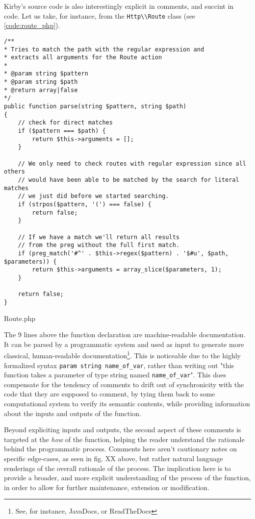 Kirby's source code is also interestingly explicit in comments, and succint in code. Let us take, for instance, from the \lstinline{Http\\Route} class (see \ref{code:route_php}).

\begin{listing}
  \begin{verbatim}
/**
* Tries to match the path with the regular expression and
* extracts all arguments for the Route action
*
* @param string $pattern
* @param string $path
* @return array|false
*/
public function parse(string $pattern, string $path)
{
    // check for direct matches
    if ($pattern === $path) {
        return $this->arguments = [];
    }

    // We only need to check routes with regular expression since all others
    // would have been able to be matched by the search for literal matches
    // we just did before we started searching.
    if (strpos($pattern, '(') === false) {
        return false;
    }

    // If we have a match we'll return all results
    // from the preg without the full first match.
    if (preg_match('#^' . $this->regex($pattern) . '$#u', $path, $parameters)) {
        return $this->arguments = array_slice($parameters, 1);
    }

    return false;
}
\end{verbatim}
  \caption{Route.php}
  \label{code:route_php}
\end{listing}

The 9 lines above the function declaration are machine-readable documentation. It can be parsed by a programmatic system and used as input to generate more classical, human-readable documentation\footnote{See, for instance, JavaDocs, or ReadTheDocs}. This is noticeable due to the highly formalized syntax \lstinline{param string name_of_var}, rather than writing out "this function takes a parameter of type string named \lstinline{name_of_var}". This does compensate for the tendency of comments to drift out of synchronicity with the code that they are supposed to comment, by tying them back to some computational system to verify its semantic contents, while providing information about the inputs and outputs of the function.

Beyond expliciting inputs and outputs, the second aspect of these comments is targeted at the \emph{how} of the function, helping the reader understand the rationale behind the programmatic process. Comments here aren't cautionary notes on specific edge-cases, as seen in fig. XX above, but rather natural language renderings of the overall rationale of the process. The implication here is to provide a broader, and more explicit understanding of the process of the function, in order to allow for further maintenance, extension or modification.

